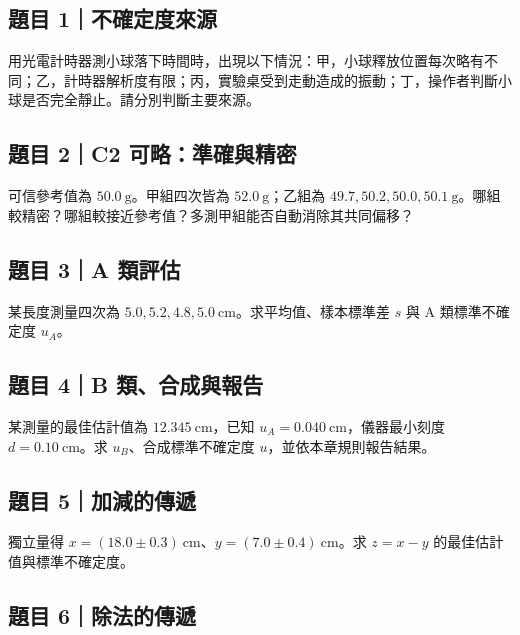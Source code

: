 \documentclass[11pt,a4paper]{article}
\begin{document}
\subsection{題目 1｜不確定度來源}\label{ux984cux76ee-1ux4e0dux78baux5b9aux5ea6ux4f86ux6e90}

用光電計時器測小球落下時間時，出現以下情況：甲，小球釋放位置每次略有不同；乙，計時器解析度有限；丙，實驗桌受到走動造成的振動；丁，操作者判斷小球是否完全靜止。請分別判斷主要來源。

\subsection{題目 2｜C2 可略：準確與精密}\label{ux984cux76ee-2c2-ux53efux7565ux6e96ux78baux8207ux7cbeux5bc6}

可信參考值為 \(50.0\ \mathrm{g}\)。甲組四次皆為 \(52.0\ \mathrm{g}\)；乙組為 \(49.7,50.2,50.0,50.1\ \mathrm{g}\)。哪組較精密？哪組較接近參考值？多測甲組能否自動消除其共同偏移？

\subsection{題目 3｜A 類評估}\label{ux984cux76ee-3a-ux985eux8a55ux4f30}

某長度測量四次為 \(5.0,5.2,4.8,5.0\ \mathrm{cm}\)。求平均值、樣本標準差 \(s\) 與 A 類標準不確定度 \(u_A\)。

\subsection{題目 4｜B 類、合成與報告}\label{ux984cux76ee-4b-ux985eux5408ux6210ux8207ux5831ux544a}

某測量的最佳估計值為 \(12.345\ \mathrm{cm}\)，已知 \(u_A=0.040\ \mathrm{cm}\)，儀器最小刻度 \(d=0.10\ \mathrm{cm}\)。求 \(u_B\)、合成標準不確定度 \(u\)，並依本章規則報告結果。

\subsection{題目 5｜加減的傳遞}\label{ux984cux76ee-5ux52a0ux6e1bux7684ux50b3ux905e}

獨立量得 \(x=(18.0\pm0.3)\ \mathrm{cm}\)、\(y=(7.0\pm0.4)\ \mathrm{cm}\)。求 \(z=x-y\) 的最佳估計值與標準不確定度。

\subsection{題目 6｜除法的傳遞}\label{ux984cux76ee-6ux9664ux6cd5ux7684ux50b3ux905e}
\end{document}
